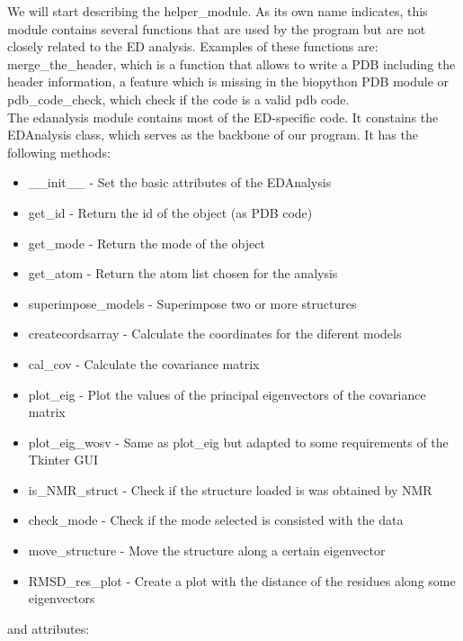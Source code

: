 \documentclass[12pt]{article}
\begin{document}
We will start describing the helper\_module. As its own name indicates, this module contains several functions that are used by the program but are not closely related to the ED analysis. Examples of these functions are: merge\_the\_header, which is a function that allows to write a PDB including the header information, a feature which is missing in the biopython PDB module or pdb\_code\_check, which check if the code is a valid pdb code.\\

The edanalysis module contains most of the ED-specific code. It constains the EDAnalysis class, which serves as the backbone of our program. It has the following methods: 
 
\begin{itemize}


       \item \_\_init\_\_ - Set the basic attributes of the EDAnalysis
       \item get\_id - Return the id of the object (as PDB code)
       \item get\_mode - Return the mode of the object
       \item get\_atom - Return the atom list chosen for the analysis
       \item superimpose\_models -  Superimpose two or more structures
      \item  createcordsarray - Calculate the coordinates for the diferent models
      \item  cal\_cov - Calculate the covariance matrix
		\item plot\_eig - Plot the values of the principal eigenvectors of the
             covariance matrix
        \item plot\_eig\_wosv - Same as plot\_eig but adapted to some requirements of
            the Tkinter GUI
       \item is\_NMR\_struct - Check if the structure loaded is was obtained by NMR
        \item check\_mode - Check if the mode selected is consisted with the data
      \item  move\_structure - Move the structure along a certain eigenvector
      \item  RMSD\_res\_plot - Create a plot with the distance of the residues along
            some eigenvectors
\end{itemize}

and attributes:
\end{document}
